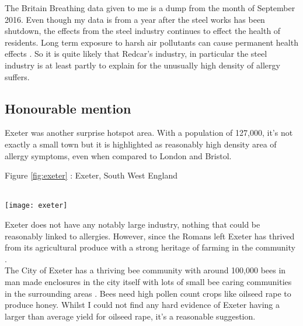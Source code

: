 The Britain Breathing data given to me is a dump from the month of September 2016. Even though my data is from a year after the steel works has been shutdown, the effects from the steel industry continues to effect the health of residents. Long term exposure to harsh air pollutants can cause permanent health effects \cite{longterm}. So it is quite likely that Redcar's industry, in particular the steel industry is at least partly to explain for the unusually high density of allergy suffers.\\

\subsection{Honourable mention}

Exeter was another surprise hotspot area. With a population of 127,000, it's not exactly a small town but it is highlighted as reasonably high density area of allergy symptoms, even when compared to London and Bristol.\\

\begin{center}
\caption{Figure \ref{fig:exeter} : Exeter, South West England\label{fig:exeter}}\\
\texttt{[image: exeter]}
\end{center}

Exeter does not have any notably large industry, nothing that could be reasonably linked to allergies. However, since the Romans left Exeter has thrived from its agricultural produce with a strong heritage of farming in the community \cite{oldexeter}.\\

The City of Exeter has a thriving bee community with around 100,000 bees in man made enclosures in the city itself with lots of small bee caring communities in the surrounding areas \cite{beeproj}. Bees need high pollen count crops like oilseed rape to produce honey. Whilst I could not find any hard evidence of Exeter having a larger than average yield for oilseed rape, it's a reasonable suggestion.